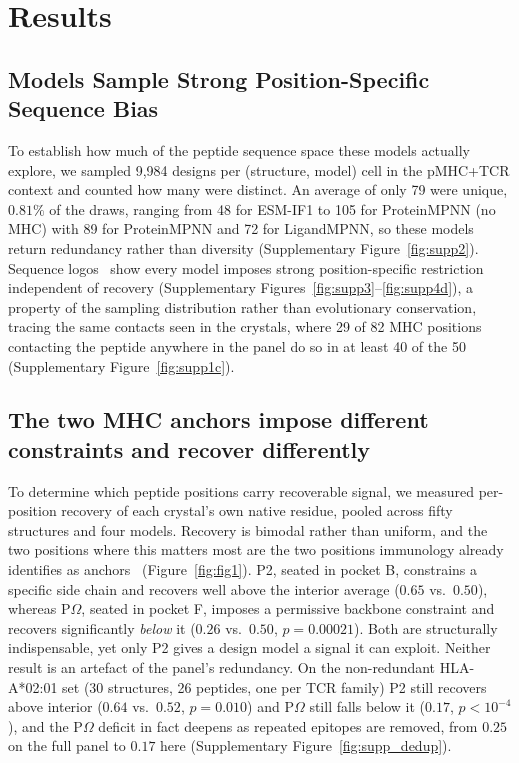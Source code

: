 \documentclass[letterpaper]{article}
\begin{document}
\section{Results}

\subsection{Models Sample Strong Position-Specific Sequence Bias}
\label{sec:sampling}

To establish how much of the peptide sequence space these models actually explore, we sampled 9,984 designs per (structure, model) cell in the pMHC+TCR context and counted how many were distinct. An average of only 79 were unique, $0.81\%$ of the draws, ranging from 48 for ESM-IF1 to 105 for ProteinMPNN (no MHC) with 89 for ProteinMPNN and 72 for LigandMPNN, so these models return redundancy rather than diversity (Supplementary Figure~\ref{fig:supp2}). Sequence logos~\citep{schneider1990logos} show every
model imposes strong position-specific restriction independent of recovery (Supplementary Figures~\ref{fig:supp3}--\ref{fig:supp4d}), a property of the sampling distribution rather than evolutionary conservation, tracing the same contacts seen in the crystals, where 29 of 82 MHC positions contacting the peptide anywhere in the panel do so in at least 40 of the 50 (Supplementary Figure~\ref{fig:supp1c}).

\subsection{The two MHC anchors impose different constraints and recover differently}
\label{sec:recovery}

To determine which peptide positions carry recoverable signal, we measured per-position recovery of each
crystal's own native residue, pooled across fifty structures and four models. Recovery is bimodal rather
than uniform, and the two positions where this matters most are the two positions immunology already
identifies as anchors~\citep{falk1991allele,madden1995three} (Figure~\ref{fig:fig1}). P2, seated in pocket B, constrains a specific side chain
and recovers well above the interior average ($0.65$ vs.\ $0.50$), whereas P$\Omega$, seated in pocket F,
imposes a permissive backbone constraint and recovers significantly \emph{below} it ($0.26$ vs.\ $0.50$,
$p=0.00021$). Both are structurally indispensable, yet only P2 gives a design model a signal it can
exploit. Neither result is an artefact of the panel's redundancy. On the non-redundant HLA-A*02:01 set (30 structures, 26 peptides, one per TCR family) P2 still recovers above interior ($0.64$ vs.\ $0.52$, $p=0.010$) and P$\Omega$ still falls below it ($0.17$, $p<10^{-4}$), and the P$\Omega$ deficit in fact deepens as repeated epitopes are removed, from $0.25$ on the full panel to $0.17$ here (Supplementary Figure~\ref{fig:supp_dedup}).
\end{document}
